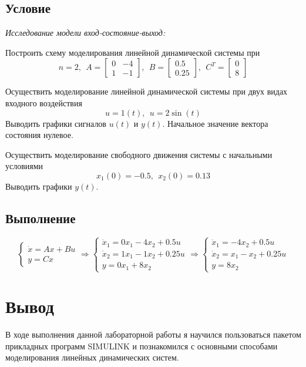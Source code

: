 \documentclass[a4paper, 12pt]{article}
\begin{document}
    \subsection{Условие}
    \textit{Исследование модели вход-состояние-выход:}
    \begin{compactitem}
    \item Построить схему моделирования линейной динамической системы при
    $$n=2,\ \
    A=
    \begin{bmatrix}
        0 & -4\\
        1 & -1
    \end{bmatrix},\ \
    B=
    \begin{bmatrix}
        0.5\\
        0.25
    \end{bmatrix},\ \
    C^T=
    \begin{bmatrix}
        0\\
        8
    \end{bmatrix}$$
    \item Осуществить моделирование линейной динамической системы при двух видах входного воздействия
    $$u=1(t),\ \ u=2\sin{(t)}$$ Выводить графики
    сигналов $u(t)$ и $y(t)$. Начальное значение вектора состояния нулевое.
    \item Осуществить моделирование свободного движения системы с начальными условиями
    $$x_1(0)=-0.5,\ \ x_2(0)=0.13$$ Выводить графики $y(t)$.
    \end{compactitem}


    \subsection{Выполнение}
    $$
    \begin{cases}
        \dot{x}=Ax+Bu\\
        y=Cx
    \end{cases}
    \Rightarrow
    \begin{cases}
    \dot{x}_1=0x_1-4x_2+0.5u\\
    \dot{x}_2=1x_1-1x_2+0.25u\\
    y=0x_1+8x_2
    \end{cases}
    \Rightarrow
    \begin{cases}
        \dot{x}_1=-4x_2+0.5u\\
        \dot{x}_2=x_1-x_2+0.25u\\
        y=8x_2
    \end{cases}
    $$


    \section{Вывод}
    В ходе выполнения данной лабораторной работы я научился пользоваться пакетом
    прикладных программ SIMULINK и познакомился с основными способами моделирования линейных динамических систем.
\end{document}
